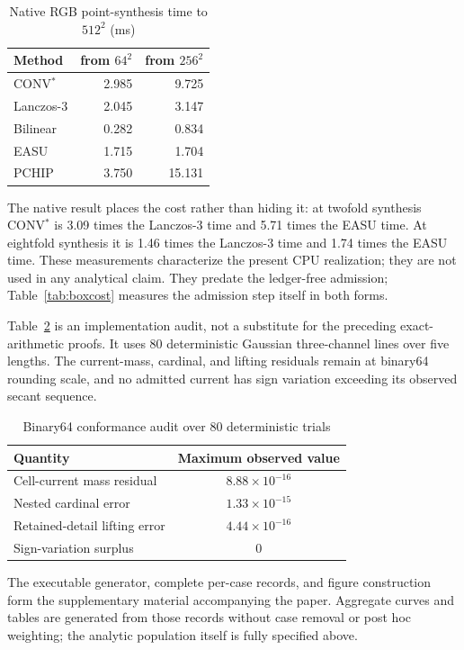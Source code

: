 \documentclass[journal]{IEEEtran}
\begin{document}
\begin{table}[H]
\caption{Native RGB point-synthesis time to $512^2$ (ms)}
\label{tab:nativecpu}
\centering
\scriptsize
\setlength{\tabcolsep}{2.7pt}
\begin{tabular}{l|rr}
\hline
Method & from $64^2$ & from $256^2$ \\
\hline
CONV$^{*}$ & 2.985 & 9.725 \\
Lanczos-3  & 2.045 & 3.147 \\
Bilinear   & 0.282 & 0.834 \\
EASU       & 1.715 & 1.704 \\
PCHIP      & 3.750 & 15.131 \\
\hline
\end{tabular}
\end{table}

The native result places the cost rather than hiding it: at twofold synthesis
CONV$^{*}$ is 3.09 times the Lanczos-3 time and 5.71 times the EASU time. At
eightfold synthesis it is 1.46 times the Lanczos-3 time and 1.74 times the
EASU time. These measurements
characterize the present CPU realization;
they are not used in any analytical claim. They predate the ledger-free
admission; Table~\ref{tab:boxcost} measures the admission step itself in
both forms.

Table~\ref{tab:binary64audit} is an implementation audit, not a substitute for
the preceding exact-arithmetic proofs. It uses 80 deterministic Gaussian
three-channel lines over five lengths. The current-mass, cardinal, and lifting
residuals remain at binary64 rounding scale, and no admitted current has sign
variation exceeding its observed secant sequence.

\begin{table}[H]
\caption{Binary64 conformance audit over 80 deterministic trials}
\label{tab:binary64audit}
\centering
\scriptsize
\begin{tabular}{l|c}
\hline
Quantity & Maximum observed value \\
\hline
Cell-current mass residual & $8.88\times10^{-16}$ \\
Nested cardinal error & $1.33\times10^{-15}$ \\
Retained-detail lifting error & $4.44\times10^{-16}$ \\
Sign-variation surplus & 0 \\
\hline
\end{tabular}
\end{table}

The executable generator, complete per-case records, and figure construction
form the supplementary material accompanying the paper. Aggregate curves and
tables are generated from those records without case removal or post hoc
weighting; the analytic population itself is fully specified above.
\end{document}
